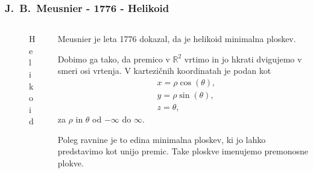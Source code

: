 \documentclass[8pt]{beamer}
\newcommand{\samplescalar}{5}  %
\theoremstyle{definition}
\theoremstyle{remark}
\theoremstyle{plain}
\numberwithin{equation}{section}  %
\begin{document}
\begin{frame}
    \frametitle{J.~B.~Meusnier - 1776 - Helikoid}
    \begin{columns}
        \begin{column}{0.5\textwidth}
            \centering
            \begin{figure}[H]
                \centering
            
                \caption{Helikoid}
            \end{figure}
        \end{column}

        \begin{column}{0.5\textwidth}
            Meusnier je leta 1776 dokazal, da je helikoid minimalna ploskev. 
            
            \vspace{0.8em}

            Dobimo ga tako, da premico v $\mathbb{R}^2$ vrtimo in jo hkrati dvigujemo v smeri osi vrtenja. V kartezičnih koordinatah je podan kot
            \begin{align*}
                & x=\rho \cos (\theta), \\
                & y=\rho \sin (\theta), \\
                & z=\theta,
            \end{align*}
            za $\rho$ in $\theta$ od $-\infty$ do $\infty$.

            \vspace{0.8em}
            
            Poleg ravnine je to edina minimalna ploskev, ki jo lahko predstavimo kot unijo premic. Take ploskve imenujemo \textcolor{red1}{premonosne plokve}.
            
        \end{column}
    \end{columns}
\end{frame}
\end{document}

